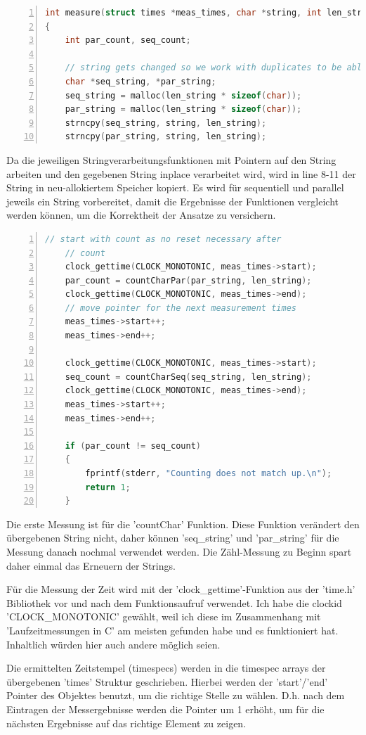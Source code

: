 \documentclass[plainarticle,zihtitle,german,final,hyperref,utf8]{zihpub}
\begin{document}
\begin{lstlisting}[language=c, numbers=left]
int measure(struct times *meas_times, char *string, int len_string)
{
	int par_count, seq_count;
	
	// string gets changed so we work with duplicates to be able to reset
	char *seq_string, *par_string;
	seq_string = malloc(len_string * sizeof(char));
	par_string = malloc(len_string * sizeof(char));
	strncpy(seq_string, string, len_string);
	strncpy(par_string, string, len_string);
\end{lstlisting}

Da die jeweiligen Stringverarbeitungsfunktionen mit Pointern auf den String arbeiten und den gegebenen String inplace verarbeitet wird, wird in line 8-11 der String in neu-allokiertem Speicher kopiert.
Es wird für se­quen­ti­ell und parallel jeweils ein String vorbereitet, damit die Ergebnisse der Funktionen vergleicht werden können, um die Korrektheit der Ansatze zu versichern.

\begin{lstlisting}[language=c, numbers=left]
	// start with count as no reset necessary after
	// count
	clock_gettime(CLOCK_MONOTONIC, meas_times->start);	
	par_count = countCharPar(par_string, len_string);
	clock_gettime(CLOCK_MONOTONIC, meas_times->end);
	// move pointer for the next measurement times
	meas_times->start++;
	meas_times->end++;
	
	clock_gettime(CLOCK_MONOTONIC, meas_times->start);	
	seq_count = countCharSeq(seq_string, len_string);
	clock_gettime(CLOCK_MONOTONIC, meas_times->end);
	meas_times->start++;
	meas_times->end++;
		
	if (par_count != seq_count)
	{
		fprintf(stderr, "Counting does not match up.\n");
		return 1;
	}
\end{lstlisting}

Die erste Messung ist für die 'countChar' Funktion. Diese Funktion verändert den übergebenen String nicht, daher können 'seq\_string' und 'par\_string' für die Messung danach nochmal verwendet werden. Die Zähl-Messung zu Beginn spart daher einmal das Erneuern der Strings.

Für die Messung der Zeit wird mit der 'clock\_gettime'-Funktion aus der 'time.h' Bibliothek vor und nach dem Funktionsaufruf verwendet. Ich habe die clockid 'CLOCK\_MONOTONIC' gewählt, weil ich diese im Zusammenhang mit 'Laufzeitmessungen in C' am meisten gefunden habe und es funktioniert hat. Inhaltlich würden hier auch andere möglich seien.

Die ermittelten Zeitstempel (timespecs) werden in die timespec arrays der übergebenen 'times' Struktur geschrieben. Hierbei werden der 'start'/'end' Pointer des Objektes benutzt, um die richtige Stelle zu wählen. D.h. nach dem Eintragen der Messergebnisse werden die Pointer um 1 erhöht, um für die nächsten Ergebnisse auf das richtige Element zu zeigen.
\end{document}

